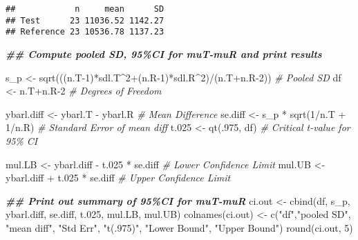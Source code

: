 \documentclass[
]{article}
\newenvironment{Shaded}{\begin{snugshade}}{\end{snugshade}}
\newcommand{\CommentTok}[1]{\textcolor[rgb]{0.56,0.35,0.01}{\textit{#1}}}
\newcommand{\DecValTok}[1]{\textcolor[rgb]{0.00,0.00,0.81}{#1}}
\newcommand{\DocumentationTok}[1]{\textcolor[rgb]{0.56,0.35,0.01}{\textbf{\textit{#1}}}}
\newcommand{\FloatTok}[1]{\textcolor[rgb]{0.00,0.00,0.81}{#1}}
\newcommand{\FunctionTok}[1]{\textcolor[rgb]{0.00,0.00,0.00}{#1}}
\newcommand{\NormalTok}[1]{#1}
\newcommand{\OtherTok}[1]{\textcolor[rgb]{0.56,0.35,0.01}{#1}}
\newcommand{\SpecialCharTok}[1]{\textcolor[rgb]{0.00,0.00,0.00}{#1}}
\newcommand{\StringTok}[1]{\textcolor[rgb]{0.31,0.60,0.02}{#1}}
\begin{document}
\begin{verbatim}
##            n     mean      SD
## Test      23 11036.52 1142.27
## Reference 23 10536.78 1137.23
\end{verbatim}

\begin{Shaded}
\begin{Highlighting}[]
\DocumentationTok{\#\# Compute pooled SD, 95\%CI for muT{-}muR and print results}

\NormalTok{s\_p }\OtherTok{\textless{}{-}} \FunctionTok{sqrt}\NormalTok{(((n.T}\DecValTok{{-}1}\NormalTok{)}\SpecialCharTok{*}\NormalTok{sdl.T}\SpecialCharTok{\^{}}\DecValTok{2}\SpecialCharTok{+}\NormalTok{(n.R}\DecValTok{{-}1}\NormalTok{)}\SpecialCharTok{*}\NormalTok{sdl.R}\SpecialCharTok{\^{}}\DecValTok{2}\NormalTok{)}\SpecialCharTok{/}\NormalTok{(n.T}\SpecialCharTok{+}\NormalTok{n.R}\DecValTok{{-}2}\NormalTok{))   }\CommentTok{\# Pooled SD}
\NormalTok{df }\OtherTok{\textless{}{-}}\NormalTok{ n.T}\SpecialCharTok{+}\NormalTok{n.R}\DecValTok{{-}2}                                              \CommentTok{\# Degrees of Freedom}

\NormalTok{ybarl.diff }\OtherTok{\textless{}{-}}\NormalTok{ ybarl.T }\SpecialCharTok{{-}}\NormalTok{ ybarl.R                              }\CommentTok{\# Mean Difference}
\NormalTok{se.diff }\OtherTok{\textless{}{-}}\NormalTok{ s\_p }\SpecialCharTok{*} \FunctionTok{sqrt}\NormalTok{(}\DecValTok{1}\SpecialCharTok{/}\NormalTok{n.T }\SpecialCharTok{+} \DecValTok{1}\SpecialCharTok{/}\NormalTok{n.R)                         }\CommentTok{\# Standard Error of mean diff}
\NormalTok{t}\FloatTok{.025} \OtherTok{\textless{}{-}} \FunctionTok{qt}\NormalTok{(.}\DecValTok{975}\NormalTok{, df)                                          }\CommentTok{\# Critical t{-}value for 95\% CI}

\NormalTok{mul.LB }\OtherTok{\textless{}{-}}\NormalTok{ ybarl.diff }\SpecialCharTok{{-}}\NormalTok{ t}\FloatTok{.025} \SpecialCharTok{*}\NormalTok{ se.diff                        }\CommentTok{\# Lower Confidence Limit}
\NormalTok{mul.UB }\OtherTok{\textless{}{-}}\NormalTok{ ybarl.diff }\SpecialCharTok{+}\NormalTok{ t}\FloatTok{.025} \SpecialCharTok{*}\NormalTok{ se.diff                        }\CommentTok{\# Upper Confidence Limit}

\DocumentationTok{\#\# Print out summary of 95\%CI for muT{-}muR}
\NormalTok{ci.out }\OtherTok{\textless{}{-}} \FunctionTok{cbind}\NormalTok{(df, s\_p, ybarl.diff, se.diff, t}\FloatTok{.025}\NormalTok{, mul.LB, mul.UB)}
\FunctionTok{colnames}\NormalTok{(ci.out) }\OtherTok{\textless{}{-}} \FunctionTok{c}\NormalTok{(}\StringTok{"df"}\NormalTok{,}\StringTok{"pooled SD"}\NormalTok{, }\StringTok{"mean diff"}\NormalTok{, }\StringTok{"Std Err"}\NormalTok{, }\StringTok{"t(.975)"}\NormalTok{, }\StringTok{"Lower Bound"}\NormalTok{, }\StringTok{"Upper Bound"}\NormalTok{)}
\FunctionTok{round}\NormalTok{(ci.out, }\DecValTok{5}\NormalTok{)}
\end{Highlighting}
\end{Shaded}
\end{document}
